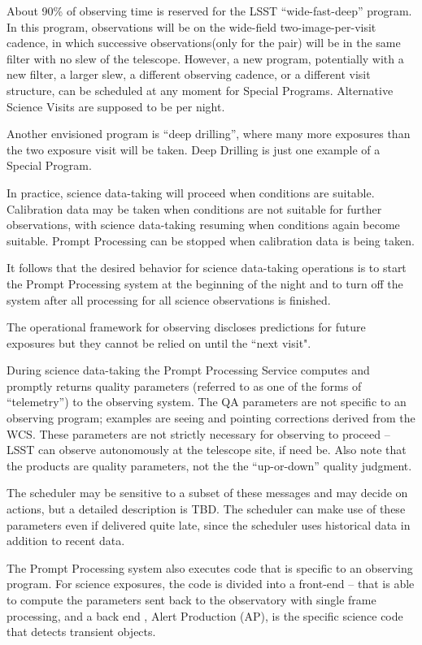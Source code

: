 About 90\% of observing time is reserved for the LSST “wide-fast-deep”
program. In this program, observations will be on the wide-field
two-image-per-visit cadence, in which successive observations(only for the pair)  will be
in the same filter with no slew of the telescope. However, a new
program, potentially with a new filter, a larger slew, a different
observing cadence, or a different visit structure, can be scheduled at
any moment for Special Programs. Alternative Science Visits are supposed to be per night.

Another envisioned program is ``deep drilling'', where many more exposures
than the two exposure visit will be taken. Deep Drilling is just one example of a Special Program.

In practice, science data-taking will proceed when conditions are
suitable. Calibration data may be taken when conditions are not
suitable for further observations, with science data-taking resuming
when conditions again become suitable. Prompt Processing can be stopped when calibration data is being taken.

It follows that the desired behavior for science data-taking
operations is to start the Prompt Processing system at the beginning
of the night and to turn off the system after all processing for all
science observations is finished.

The operational framework for observing discloses predictions for future exposures but they cannot be relied on until the “next visit".

During science data-taking the Prompt Processing Service computes and
promptly returns quality  parameters (referred to as one of the forms of “telemetry”) to the
observing system. The QA parameters are not specific to an observing
program; examples are seeing and pointing corrections derived from the
WCS. These parameters are not strictly necessary for observing to
proceed -- LSST can observe autonomously at the telescope site, if
need be. Also note that the products are quality parameters, not the
the “up-or-down” quality judgment.

The scheduler may be sensitive to a subset of these messages and may
decide on actions, but a detailed description is TBD.
The scheduler can make use of these parameters even
if delivered quite late, since the scheduler uses historical data
in addition to recent data.

The Prompt Processing system also executes code that is specific to an
observing program. For science exposures, the code is divided into
a front-end -- that is able to compute the parameters sent back  to the
observatory with single frame processing, and a back end , Alert Production (AP), is the specific
science code that detects transient objects.

